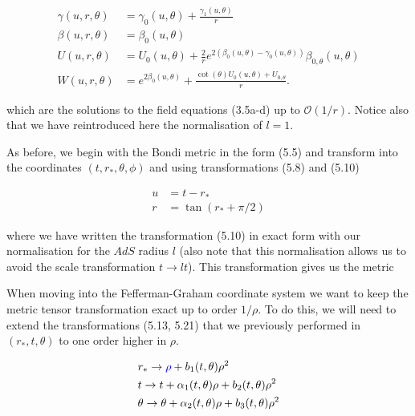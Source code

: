 \documentclass[a4paper,11pt]{article}
\numberwithin{equation}{section}
\begin{document}
\begin{subequations}
\begin{align}
\gamma(u,r,\theta)&=\gamma_{0}(u,\theta)+ \frac{\gamma_{1} (u,\theta)}{r}  \\
\beta(u,r,\theta)&=\beta_{0}(u,\theta)  \\
U(u,r,\theta)&=U_{0}(u,\theta)+\frac{2}{r}e^{2(\beta_{0}(u,\theta)-\gamma_{0}(u,\theta))}\beta_{0,\theta}(u,\theta) \\
W(u,r,\theta)&=e^{2\beta_{0}(u,\theta)}+\frac{\cot(\theta)U_{0}(u,\theta)+U_{0,\theta}}{r}.
\end{align}
\end{subequations}

\noindent which are the solutions to the field equations (3.5a-d) up to $\mathcal{O}(1/r)$. Notice also that we have reintroduced here the normalisation of $l=1$. \par

As before, we begin with the Bondi metric in the form (5.5) and transform into the coordinates $(t, r_*, \theta, \phi)$ and using transformations (5.8) and (5.10) 

\begin{subequations}
\begin{align}
u&=t-r_* \\
r&=\tan(r_*+ \pi/2)
\end{align}
\end{subequations}

\noindent where we have written the transformation (5.10) in exact form with our normalisation for the $AdS$ radius $l$ (also note that this normalisation allows us to avoid the scale transformation $t \rightarrow lt$). This transformation gives us the metric \par

When moving into the Fefferman-Graham coordinate system we want to keep the metric tensor transformation exact up to order $1/\rho$. To do this, we will need to extend the transformations (5.13, 5.21) that we previously performed in $(r_* ,t,\theta)$ to one order higher in $\rho$.  

\begin{subequations}
\begin{align}
&r_* \rightarrow \textcolor{blue}{\rho}  + b_1(t,\theta) \rho^2 \\
&t \rightarrow t + \alpha_1(t,\theta)\rho + b_2(t,\theta) \rho^2 \\
&\theta \rightarrow \theta + \alpha_2(t,\theta)\rho + b_3(t,\theta) \rho^2 
\end{align}
\end{subequations}
\end{document}

